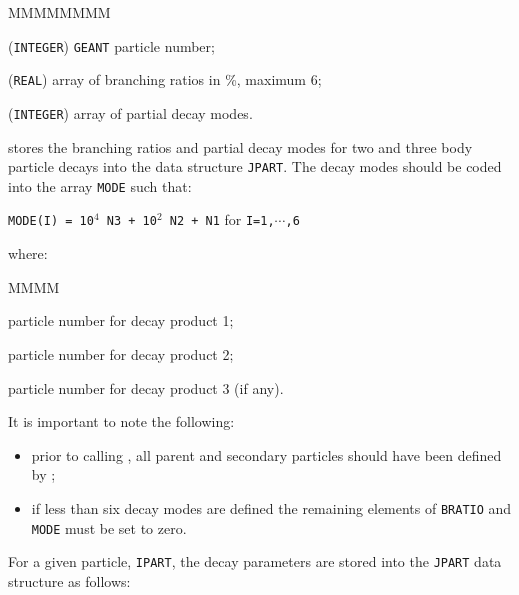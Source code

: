      
\begin{DLtt}{MMMMMMMM}
\item[IPART]       ({\tt INTEGER}) {\tt GEANT} particle number;
\item[BRATIO]   ({\tt REAL}) array of branching ratios in \%,
maximum 6;
\item[MODE]     ({\tt INTEGER}) array of partial decay modes.
\end{DLtt}
 stores the branching ratios and partial decay modes for two
and three body particle decays into the data structure {\tt JPART}.
The decay modes should be coded into the array {\tt MODE} such that:
\begin{center}
{\tt MODE(I) =  10$^4$ N3 + 10$^2$ N2 + N1} \hspace{2cm}
for {\tt I=1,$\cdots$,6}
\end{center}
where:
\begin{DLtt}{MMMM}
\item [N1]     particle number for decay product 1;
\item [N2]     particle number for decay product 2;
\item [N3]     particle number for decay product 3 (if any).
\end{DLtt}
It is important to note the following:
\begin{itemize}
\item  prior to calling , all parent and secondary particles should
have been defined by ;
\item  if less than six decay modes are defined the remaining elements
of {\tt BRATIO} and {\tt MODE} must be set to zero.
\end{itemize}
For a given particle, {\tt IPART}, the decay parameters are stored into
the {\tt JPART} data structure as follows:

